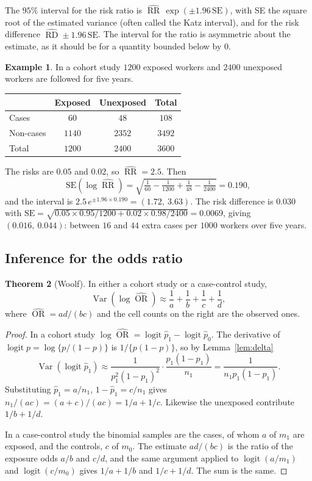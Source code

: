 \documentclass[11pt,a4paper]{article}
\numberwithin{equation}{section}
\DeclareMathOperator{\Var}{Var}
\DeclareMathOperator{\OR}{OR}
\DeclareMathOperator{\RR}{RR}
\DeclareMathOperator{\RD}{RD}
\theoremstyle{definition}
\newtheorem{thm}{Theorem}[subsection]
\newtheorem{exa}[thm]{Example}
\begin{document}
The $95\%$ interval for the risk ratio is $\widehat{\RR}\,\exp(\pm 1.96\,\text{SE})$, with SE the square root of the estimated variance (often called
the Katz interval), and for the risk difference $\widehat{\RD} \pm 1.96\,\text{SE}$. The interval for the ratio is asymmetric about the estimate, as it
should be for a quantity bounded below by $0$.

\begin{exa}
\label{exa:cohort}
In a cohort study $1200$ exposed workers and $2400$ unexposed workers are followed for five years.
\begin{center}
\begin{tabular}{l|cc|c}
 & Exposed & Unexposed & Total \\
\hline
Cases & $60$ & $48$ & $108$ \\
Non-cases & $1140$ & $2352$ & $3492$ \\
\hline
Total & $1200$ & $2400$ & $3600$ \\
\end{tabular}
\end{center}
The risks are $0.05$ and $0.02$, so $\widehat{\RR} = 2.5$. Then
\[
\text{SE}(\log\widehat{\RR}) = \sqrt{\tfrac{1}{60} - \tfrac{1}{1200} + \tfrac{1}{48} - \tfrac{1}{2400}} = 0.190 ,
\]
and the interval is $2.5\,e^{\pm 1.96 \times 0.190} = (1.72,\ 3.63)$. The risk difference is $0.030$ with
$\text{SE} = \sqrt{0.05 \times 0.95/1200 + 0.02 \times 0.98/2400} = 0.0069$, giving $(0.016,\ 0.044)$: between $16$ and $44$ extra cases per $1000$ workers over
five years.
\end{exa}

\subsection{Inference for the odds ratio}
\label{sec:orci}

\begin{thm}[Woolf]
\label{thm:woolf}
In either a cohort study or a case-control study,
\[
\Var(\log\widehat{\OR}) \approx \frac{1}{a} + \frac{1}{b} + \frac{1}{c} + \frac{1}{d} ,
\]
where $\widehat{\OR} = ad/(bc)$ and the cell counts on the right are the observed ones.
\end{thm}

\begin{proof}
In a cohort study $\log\widehat{\OR} = \operatorname{logit}\hat p_1 - \operatorname{logit}\hat p_0$. The derivative of $\operatorname{logit} p = \log\{p/(1 - p)\}$ is $1/\{p(1 - p)\}$, so by
Lemma~\ref{lem:delta}
\[
\Var(\operatorname{logit}\hat p_1) \approx \frac{1}{p_1^2(1 - p_1)^2} \cdot \frac{p_1(1 - p_1)}{n_1} = \frac{1}{n_1 p_1(1 - p_1)} .
\]
Substituting $\hat p_1 = a/n_1$, $1 - \hat p_1 = c/n_1$ gives $n_1/(ac) = (a + c)/(ac) = 1/a + 1/c$. Likewise the unexposed contribute $1/b + 1/d$.

In a case-control study the binomial samples are the cases, of whom $a$ of $m_1$ are exposed, and the controls, $c$ of $m_0$. The
estimate $ad/(bc)$ is the ratio of the exposure odds $a/b$ and $c/d$, and the same argument applied to $\operatorname{logit}(a/m_1)$ and
$\operatorname{logit}(c/m_0)$ gives $1/a + 1/b$ and $1/c + 1/d$. The sum is the same.
\end{proof}
\end{document}
